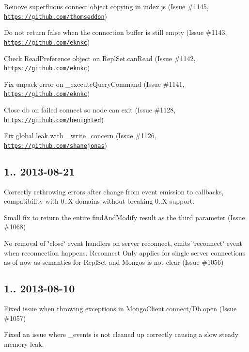 \begin{DoxyItemize}
\item Remove superfluous connect object copying in index.\+js (Issue \#1145, \href{https://github.com/thomseddon}{\tt https\+://github.\+com/thomseddon})
\item Do not return false when the connection buffer is still empty (Issue \#1143, \href{https://github.com/eknkc}{\tt https\+://github.\+com/eknkc})
\item Check Read\+Preference object on Repl\+Set.\+can\+Read (Issue \#1142, \href{https://github.com/eknkc}{\tt https\+://github.\+com/eknkc})
\item Fix unpack error on \+\_\+execute\+Query\+Command (Issue \#1141, \href{https://github.com/eknkc}{\tt https\+://github.\+com/eknkc})
\item Close db on failed connect so node can exit (Issue \#1128, \href{https://github.com/benighted}{\tt https\+://github.\+com/benighted})
\item Fix global leak with \+\_\+write\+\_\+concern (Issue \#1126, \href{https://github.com/shanejonas}{\tt https\+://github.\+com/shanejonas})
\end{DoxyItemize}

\subsection*{1.. 2013-\/08-\/21 }


\begin{DoxyItemize}
\item Correctly rethrowing errors after change from event emission to callbacks, compatibility with 0..\+X domains without breaking 0..\+X support.
\item Small fix to return the entire find\+And\+Modify result as the third parameter (Issue \#1068)
\item No removal of \char`\"{}close\char`\"{} event handlers on server reconnect, emits \char`\"{}reconnect\char`\"{} event when reconnection happens. Reconnect Only applies for single server connections as of now as semantics for Repl\+Set and Mongos is not clear (Issue \#1056)
\end{DoxyItemize}

\subsection*{1.. 2013-\/08-\/10 }


\begin{DoxyItemize}
\item Fixed issue when throwing exceptions in Mongo\+Client.\+connect/\+Db.open (Issue \#1057)
\item Fixed an issue where \+\_\+events is not cleaned up correctly causing a slow steady memory leak.
\end{DoxyItemize}

